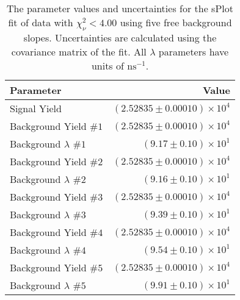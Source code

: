 
\begin{table}[ht]
    \begin{center}
        \begin{tabular}{lr}\toprule
            Parameter & Value \\\midrule
            Signal Yield & $(2.52835 \pm 0.00010) \times 10^{4}$ \\
            Background Yield $\#1$ & $(2.52835 \pm 0.00010) \times 10^{4}$ \\
            Background $\lambda$ $\#1$ & $(9.17 \pm 0.10) \times 10^{1}$ \\
            Background Yield $\#2$ & $(2.52835 \pm 0.00010) \times 10^{4}$ \\
            Background $\lambda$ $\#2$ & $(9.16 \pm 0.10) \times 10^{1}$ \\
            Background Yield $\#3$ & $(2.52835 \pm 0.00010) \times 10^{4}$ \\
            Background $\lambda$ $\#3$ & $(9.39 \pm 0.10) \times 10^{1}$ \\
            Background Yield $\#4$ & $(2.52835 \pm 0.00010) \times 10^{4}$ \\
            Background $\lambda$ $\#4$ & $(9.54 \pm 0.10) \times 10^{1}$ \\
            Background Yield $\#5$ & $(2.52835 \pm 0.00010) \times 10^{4}$ \\
            Background $\lambda$ $\#5$ & $(9.91 \pm 0.10) \times 10^{1}$ \\\bottomrule
        \end{tabular}
        \caption{The parameter values and uncertainties for the sPlot fit of data with $\chi^2_\nu < 4.00$ using five free background slopes. Uncertainties are calculated using the covariance matrix of the fit. All $\lambda$ parameters have units of $\si{\nano\second}^{-1}$.}\label{tab:splot-fit-results-chisqdof-4.00-free-5}
    \end{center}
\end{table}

